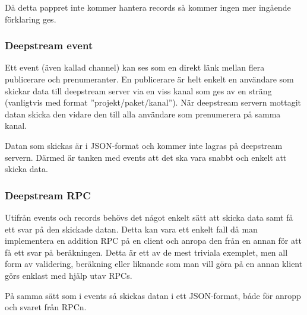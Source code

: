 Då detta pappret inte kommer hantera records så kommer ingen mer ingående förklaring ges\cite{ds-storingdata}.

\subsubsection{Deepstream event}
Ett event (även kallad channel) kan ses som en direkt länk mellan flera publicerare och prenumeranter. En publicerare är helt enkelt en användare som skickar data till deepstream server via en viss kanal som ges av en sträng (vanligtvis med format ''projekt/paket/kanal''). När deepstream servern mottagit datan skicka den vidare den till alla användare som prenumerera på samma kanal. 

Datan som skickas är i JSON-format och kommer inte lagras på deepstream servern. Därmed är tanken med events att det ska vara snabbt och enkelt att skicka data. 

\subsubsection{Deepstream RPC}
Utifrån events och records behövs det något enkelt sätt att skicka data samt få ett svar på den skickade datan. Detta kan vara ett enkelt fall då man implementera en addition RPC på en client och anropa den från en annan för att få ett svar på beräkningen. Detta är ett av de mest triviala exemplet, men all form av validering, beräkning eller liknande som man vill göra på en annan klient görs enklast med hjälp utav RPCs.

På samma sätt som i events så skickas datan i ett JSON-format, både för anropp och svaret från RPCn.


